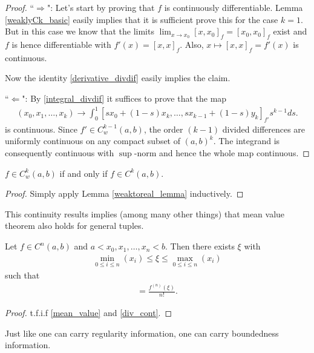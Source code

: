\begin{proof}
	``$\Rightarrow$": Let's start by proving that $f$ is continuously differentiable. Lemma \ref{weaklyCk_basic} easily implies that it is sufficient prove this for the case $k = 1$. But in this case we know that the limits $\lim_{x \to x_{0}} [x, x_{0}]_{f} = [x_{0}, x_{0}]_{f}$ exist and $f$ is hence differentiable with $f'(x) = [x, x]_{f}$. Also, $x \mapsto [x, x]_{f} = f'(x)$ is continuous.

	Now the identity \ref{derivative_divdif} easily implies the claim.

	``$\Leftarrow$": By \ref{integral_divdif} it suffices to prove that the map
	\begin{align*}
		(x_{0}, x_{1}, \ldots, x_{k}) \to \int_{0}^{1}[s x_{0} + (1 - s) x_{k}, \ldots, s x_{k - 1} + (1 - s) y_{k}]_{f'} s^{k - 1} d s.
	\end{align*}
	is continuous. Since $f' \in C_{w}^{k - 1}(a, b)$, the order $(k - 1)$ divided differences are uniformly continuous on any compact subset of $(a, b)^{k}$. The integrand is consequently continuous with $\sup$-norm and hence the whole map continuous.
\end{proof}

\begin{kor}\label{div_cont}
	$f \in C_{w}^{k}(a, b)$ if and only if $f \in C^{k}(a, b)$.
\end{kor}
\begin{proof}
	Simply apply Lemma \ref{weaktoreal_lemma} inductively.
\end{proof}

This continuity results implies (among many other things) that mean value theorem also holds for general tuples.
\begin{kor}
	Let $f \in C^{n}(a, b)$ and $a < x_{0}, x_{1}, \ldots, x_{n} < b$. Then there exists $\xi$ with
	\begin{align*}
		\min_{0 \leq i \leq n}(x_{i}) \leq \xi \leq \max_{0 \leq i \leq n}(x_{i})
	\end{align*}
	such that
	\begin{align}
		[x_{0}, x_{1}, \ldots, x_{n}] = \frac{f^{(n)}(\xi)}{n!}.
	\end{align}
\end{kor}
\begin{proof}
	t.f.i.f \ref{mean_value} and \ref{div_cont}.
\end{proof}

Just like one can carry regularity information, one can carry boundedness information.

